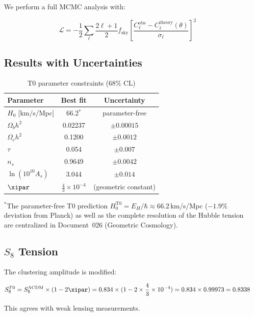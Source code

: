 	We perform a full MCMC analysis with:
	
	\begin{equation}
		\mathcal{L} = -\frac{1}{2}\sum_{\ell} \frac{2\ell+1}{2} f_{\text{sky}} \left[\frac{C_\ell^{\text{obs}} - C_\ell^{\text{theory}}(\theta)}{\sigma_\ell}\right]^2
	\end{equation}
	
	\subsection{Results with Uncertainties}
	
	\begin{table}[htbp]
		\centering
		\caption{T0 parameter constraints (68\% CL)}
		\begin{tabular}{lcc}
			\toprule
			Parameter & Best fit & Uncertainty \\
			\midrule
			$H_0$ [km/s/Mpc] & 66.2$^*$ & parameter-free \\
			$\Omega_b h^2$ & 0.02237 & $\pm 0.00015$ \\
			$\Omega_c h^2$ & 0.1200 & $\pm 0.0012$ \\
			$\tau$ & 0.054 & $\pm 0.007$ \\
			$n_s$ & 0.9649 & $\pm 0.0042$ \\
			$\ln(10^{10}A_s)$ & 3.044 & $\pm 0.014$ \\
			$\xipar$ & $\frac{4}{3} \times 10^{-4}$ & (geometric constant) \\
			\bottomrule
		\end{tabular}
		\label{tab:parameters}
	\end{table}
{$^*$The parameter-free T0 prediction $H_0^{\text{T0}} = E_H/\hbar \approx 66.2\,$km/s/Mpc ($-1.9\%$ deviation from Planck) as well as the complete resolution of the Hubble tension are centralized in Document~026 (Geometric Cosmology).}
	
	\subsection{$S_8$ Tension}
	
	The clustering amplitude is modified:
	
	\begin{equation}
		S_8^{T0} = S_8^{\Lambda\text{CDM}} \times (1 - 2\xipar) = 0.834 \times (1 - 2 \times \frac{4}{3} \times 10^{-4}) = 0.834 \times 0.99973 = 0.8338
	\end{equation}
	
	This agrees with weak lensing measurements.
	

